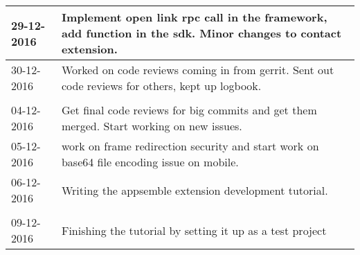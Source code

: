 \begin{tabular}{|p{2cm}|p{11cm}|}
	\hline
	29-12-2016 &  Implement open link rpc call in the framework, add function in the sdk. Minor changes to contact extension. \\ \hline
	30-12-2016 &  Worked on code reviews coming in from gerrit. Sent out code reviews for others, kept up logbook. \\ \hline
	
	\\ \hline
	
	04-12-2016 &  Get final code reviews for big commits and get them merged. Start working on new issues. \\ \hline
	05-12-2016 &  work on frame redirection security and start work on base64 file encoding issue on mobile. \\ \hline
	06-12-2016 & Writing the appsemble extension development tutorial. \\ \hline
	
	\\ \hline
	
	09-12-2016 & Finishing the tutorial by setting it up as a test project \\ \hline
\end{tabular}
